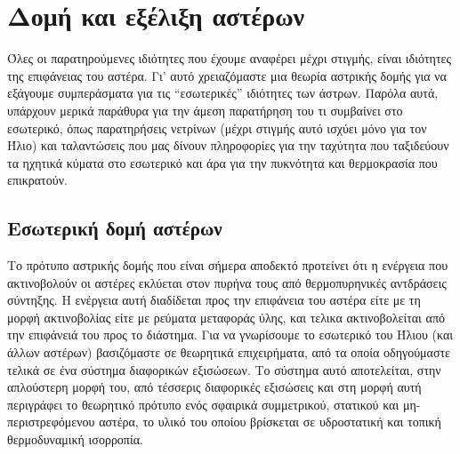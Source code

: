 \chapter{Δομή και εξέλιξη αστέρων}
\label{ch:Chapter5}

Όλες οι παρατηρούμενες ιδιότητες που έχουμε αναφέρει μέχρι στιγμής, είναι ιδιότητες της επιφάνειας του αστέρα. Γι' αυτό χρειαζόμαστε μια θεωρία αστρικής δομής για να εξάγουμε συμπεράσματα για τις ``εσωτερικές'' ιδιότητες των άστρων. Παρόλα αυτά, υπάρχουν μερικά παράθυρα για την άμεση παρατήρηση του τι συμβαίνει στο εσωτερικό, όπως παρατηρήσεις νετρίνων (μέχρι στιγμής αυτό ισχύει μόνο για τον Ήλιο) και ταλαντώσεις που μας δίνουν πληροφορίες για την ταχύτητα που ταξιδεύουν τα ηχητικά κύματα στο εσωτερικό και άρα για την πυκνότητα και θερμοκρασία που επικρατούν.
\section{Εσωτερική δομή αστέρων}
Το πρότυπο αστρικής δομής που είναι σήμερα αποδεκτό προτείνει ότι η ενέργεια που ακτινοβολούν οι αστέρες εκλύεται στον πυρήνα τους από θερμοπυρηνικές αντδράσεις σύντηξης. Η ενέργεια αυτή διαδίδεται προς την επιφάνεια του αστέρα είτε με τη μορφή ακτινοβολίας είτε με ρεύματα μεταφοράς ύλης, και τελικα ακτινοβολείται από την επιφάνειά του προς το διάστημα. Για να γνωρίσουμε το εσωτερικό του Ήλιου (και άλλων αστέρων) βασιζόμαστε σε θεωρητικά επιχειρήματα, από τα οποία οδηγούμαστε τελικά σε ένα σύστημα διαφορικών εξισώσεων. Το σύστημα αυτό αποτελείται, στην απλούστερη μορφή του, από τέσσερις διαφορικές εξισώσεις και στη μορφή αυτή περιγράφει το θεωρητικό πρότυπο ενός σφαιρικά συμμετρικού, στατικού και μη-περιστρεφόμενου αστέρα, το υλικό του οποίου βρίσκεται σε υδροστατική και τοπική θερμοδυναμική ισορροπία.
